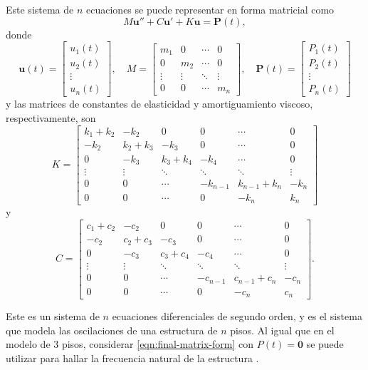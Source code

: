 Este sistema de \(n\) ecuaciones se puede representar en forma matricial como
\begin{equation}\label{eqn:final-matrix-form}
    M\mathbf{u}'' + C\mathbf{u}' + K\mathbf{u} = \mathbf{P}(t)
,\end{equation}
donde
\begin{equation}
    \mathbf{u}(t) = \begin{bmatrix} u_1(t) \\ u_2(t) \\ \vdots \\ u_n(t) \end{bmatrix},
    \quad
    M = \begin{bmatrix}
        m_1 & 0 & \cdots & 0 \\
        0 & m_2 & \cdots & 0 \\
        \vdots & \vdots & \ddots & \vdots \\
        0 & 0 & \cdots & m_n
    \end{bmatrix},
    \quad
    \mathbf{P}(t) = \begin{bmatrix} P_1(t) \\ P_2(t) \\ \vdots \\ P_n(t) \end{bmatrix}
\end{equation}
y las matrices de constantes de elasticidad y amortiguamiento viscoso, respectivamente, son
\begin{equation}
    K = \begin{bmatrix}
        k_1 + k_2 & -k_2 & 0 & 0 & \cdots & 0 \\
        -k_2 & k_2 + k_3 & -k_3 & 0 & \cdots & 0 \\
        0 & -k_3 & k_3 + k_4 & -k_4 & \cdots & 0 \\
        \vdots & \vdots & \ddots & \ddots & \ddots & \vdots \\
        0 & 0 & \cdots & -k_{n-1} & k_{n-1} + k_n & -k_n \\
        0 & 0 & \cdots & 0 & -k_{n} & k_n
    \end{bmatrix}
\end{equation}
y
\begin{equation}
    C = \begin{bmatrix}
        c_1 + c_2 & -c_2 & 0 & 0 & \cdots & 0 \\
        -c_2 & c_2 + c_3 & -c_3 & 0 & \cdots & 0 \\
        0 & -c_3 & c_3 + c_4 & -c_4 & \cdots & 0 \\
        \vdots & \vdots & \ddots & \ddots & \ddots & \vdots \\
        0 & 0 & \cdots & -c_{n-1} & c_{n-1} + c_n & -c_n \\
        0 & 0 & \cdots & 0 & -c_{n} & c_n
    \end{bmatrix}
.\end{equation}

Este es un sistema de \(n\) ecuaciones diferenciales de segundo orden, y es el sistema que modela las oscilaciones de una estructura de \(n\) pisos. Al igual que en el modelo de 3 pisos, considerar \eqref{eqn:final-matrix-form} con \(P(t) = \mathbf{0}\) se puede utilizar para hallar la frecuencia natural de la estructura \citep{rendon}.